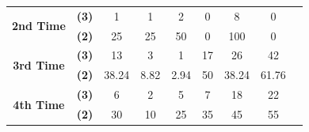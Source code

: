 \begin{table}
{\begin{tabular}{|c|c|c|c|c|c|c|c|p{3cm}|}
         \multirow{2}{*}{\textbf{2nd Time}} & \textbf{(3)} & 1 & 1 & 2 & 0 & 8 & 0 & \\ \cline{2-8}
         & \textbf{(2)} & 25 & 25 & 50 & 0 & 100 & 0 & \\ \cline{1-8}
         
         \multirow{2}{*}{\textbf{3rd Time}}& \textbf{(3)} & 13 & 3 & 1 & 17 & 26 & 42 & \\ \cline{2-8}
         & \textbf{(2)} & 38.24 & 8.82 & 2.94 & 50 & 38.24 & 61.76 & \\  \cline{1-8}
         
         \multirow{2}{*}{\textbf{4th Time}}& \textbf{(3)} & 6 & 2 & 5 & 7 & 18 & 22 & \\  \cline{2-8}
         & \textbf{(2)} & 30 & 10 & 25 & 35 & 45 & 55 & \\  \hline
         
         
    \end{tabular}
        }
    \label{tb5}

    
\end{table}

